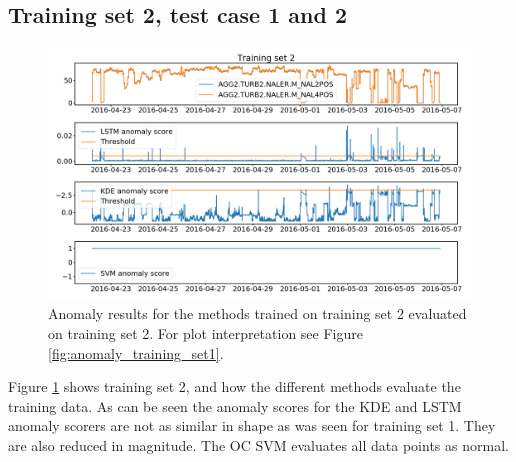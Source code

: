     \subsection{Training set 2, test case 1 and 2}
        \begin{figure}
            \centering
            \includegraphics[width=\textwidth]{report/figures/analysis/plant2_train_short/training_data_anomaly.png}
            \caption{Anomaly results for the methods trained on training set 2 evaluated on training set 2. For plot interpretation see Figure \ref{fig:anomaly_training_set1}.}
            \label{fig:anomaly_training_set2}
        \end{figure}
        Figure \ref{fig:anomaly_training_set2} shows training set 2, and how the different methods evaluate the training data. As can be seen the anomaly scores for the KDE and LSTM anomaly scorers are not as similar in shape as was seen for training set 1. They are also reduced in magnitude. The OC SVM evaluates all data points as normal. 
    
